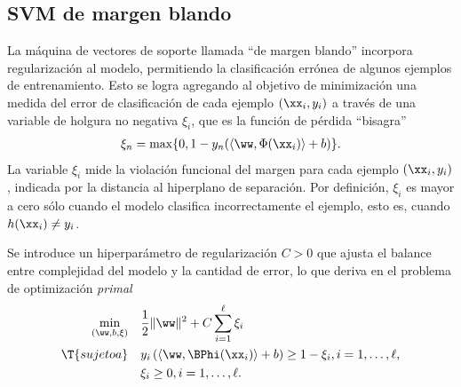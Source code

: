 %
%
\subsection{SVM de margen blando}
%
La máquina de vectores de soporte llamada ``de margen blando''
incorpora regularización al modelo, permitiendo la clasificación
errónea de algunos ejemplos de entrenamiento.
%
Esto se logra agregando al objetivo de minimización una medida del
error de clasificación de cada ejemplo $(\xx_i,y_i)$ a través de una
variable de holgura no negativa $\xi_i$, que es la función de pérdida
``bisagra''
%
\begin{align}
  \xi_n = \max\{0,1-y_n(\langle{}\ww,\Phi(\xx_i)\rangle+b)\}.
\end{align}
%
La variable $\xi_i$ mide la violación funcional del margen para cada
ejemplo $(\xx_i,y_i)$, indicada por la distancia al hiperplano de
separación. Por definición, $\xi_i$ es mayor a cero sólo cuando el
modelo clasifica incorrectamente el ejemplo, esto es, cuando
$h(\xx_i)\neq{}y_i$.

Se introduce un hiperparámetro de regularización $C>0$ que ajusta el
balance entre complejidad del modelo y la cantidad de error, lo que deriva
en el problema de optimización \emph{primal}
%
\begin{align}
  \label{svm-primal-blando}
  \begin{split}
    \min_{(\ww,b,\xi)} \quad & \frac{1}{2}\|\ww\|^2+C\sum_{i=1}^{\ell}\xi_i\\
    \T{sujeto a} \quad &
    y_i\left(\langle{}\ww,\BPhi(\xx_i)\rangle+b\right) \geq 1-\xi_i, i=1,\ldots,\ell, \\
    & \xi_i \geq 0, i=1,\ldots,\ell.
  \end{split}
\end{align}
%



